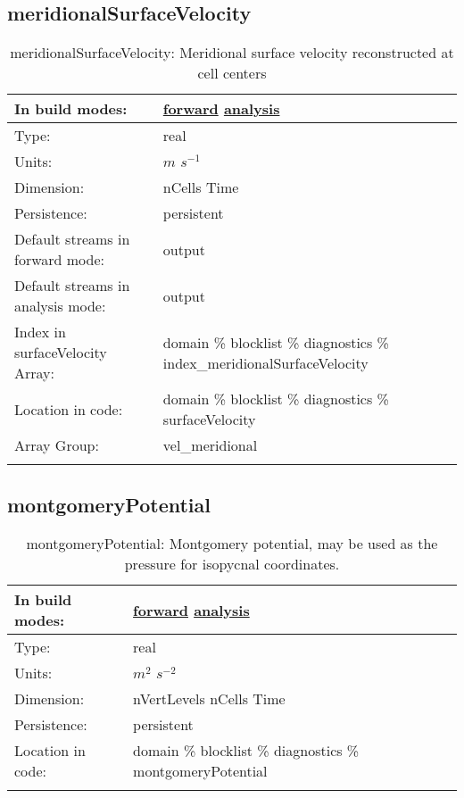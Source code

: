 \subsection[meridionalSurfaceVelocity]{meridionalSurfaceVelocity}
\label{subsec:var_sec_diagnostics_meridionalSurfaceVelocity}
\begin{center}
\begin{longtable}{| p{2.0in} | p{4.0in} |}
        \hline 
        In build modes: & \hyperref[subsec:forward_var_tab_diagnostics]{forward} \hyperref[subsec:analysis_var_tab_diagnostics]{analysis} \\
        \hline 
        Type: & real \\
        \hline 
        Units: & $m$ $s^{-1}$ \\
        \hline 
        Dimension: & nCells Time \\
        \hline 
        Persistence: & persistent \\
        \hline 
		 Default streams in forward mode: &  output \\
        \hline 
		 Default streams in analysis mode: &  output \\
        \hline 
		 Index in surfaceVelocity Array: & domain \% blocklist \% diagnostics \% index\_meridionalSurfaceVelocity \\
		 \hline 
		 Location in code: & domain \% blocklist \% diagnostics \% surfaceVelocity \\
		 \hline 
		 Array Group: & vel\_meridional \\
		 \hline 
    \caption{meridionalSurfaceVelocity: Meridional surface velocity reconstructed at cell centers}
\end{longtable}
\end{center}
\subsection[montgomeryPotential]{montgomeryPotential}
\label{subsec:var_sec_diagnostics_montgomeryPotential}
\begin{center}
\begin{longtable}{| p{2.0in} | p{4.0in} |}
        \hline 
        In build modes: & \hyperref[subsec:forward_var_tab_diagnostics]{forward} \hyperref[subsec:analysis_var_tab_diagnostics]{analysis} \\
        \hline 
        Type: & real \\
        \hline 
        Units: & $m^2$ $s^{-2}$ \\
        \hline 
        Dimension: & nVertLevels nCells Time \\
        \hline 
        Persistence: & persistent \\
        \hline 
		 Location in code: & domain \% blocklist \% diagnostics \% montgomeryPotential \\
		 \hline 
    \caption{montgomeryPotential: Montgomery potential, may be used as the pressure for isopycnal coordinates.}
\end{longtable}
\end{center}
